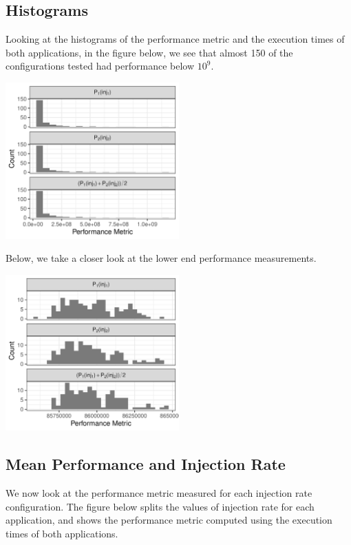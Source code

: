 \documentclass[a4paper]{article}
\begin{document}
\subsection{Histograms}
\label{sec:orgbe15910}
Looking at the  histograms of the performance metric and  the execution times of
both  applications,  in  the  figure  below,  we see  that  almost  150  of  the
configurations tested had performance below \(10^{9}\).

\begin{center}
\includegraphics[width=0.5\textwidth]{./img/2_apps_min_mean_time/rs_20_samples_10_iterations_histogram.pdf}
\end{center}

Below, we take a closer look at the lower end performance measurements.

\begin{center}
\includegraphics[width=0.5\textwidth]{./img/2_apps_min_mean_time/rs_20_samples_10_iterations_histogram_cut.pdf}
\end{center}

\subsection{Mean Performance and Injection Rate}
\label{sec:orgd50c907}
We  now  look  at  the  performance metric  measured  for  each  injection  rate
configuration.  The  figure below splits the  values of injection rate  for each
application, and shows the performance metric computed using the execution times
of both applications.
\end{document}
